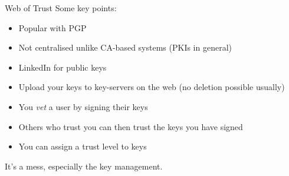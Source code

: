 \begin{frame}{Web of Trust}
  Some key points:
  \begin{itemize}[<+(1)->]
    \item Popular with PGP
    \item Not centralised unlike CA-based systems (PKIs in general)
    \item LinkedIn for public keys
    \item Upload your keys to key-servers on the web (no deletion possible usually)
    \item You \emph{vet} a user by signing their keys
    \item Others who trust you can then trust the keys you have signed
    \item You can assign a trust level to keys
  \end{itemize}

  \pause
  It's a mess, especially the key management.
\end{frame}


